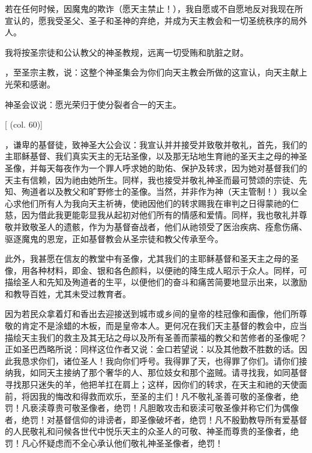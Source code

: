 若在任何时候，因魔鬼的欺诈（愿天主禁止！），我自愿或不自愿地反对我现在所宣认的，愿我受圣父、圣子和圣神的弃绝，并成为天主教会和一切圣统秩序的局外人。\par

我将按圣宗徒和公认教父的神圣教规，远离一切受贿和肮脏之财。\par

，至圣宗主教，说：这整个神圣集会为你们向天主教会所做的这宣认，向天主献上光荣和感谢。\par

神圣会议说：愿光荣归于使分裂者合一的天主。\par

[ (col. 60)]\par

，谦卑的基督徒，致神圣大公会议：我宣认并并接受并致敬并敬礼，首先，我们的主耶稣基督、我们真实天主的无玷圣像，以及那无玷地生育祂的圣天主之母的神圣圣像，并每天每夜作为一个罪人呼求她的助佑、保护及转求，因为她对基督我们的天主有信赖，因为祂由她所生。同样，我也接受并敬礼神圣而最可赞颂的宗徒、先知、殉道者以及教父和旷野修士的圣像。当然，并非作为神（天主管制！）我以全心求他们所有人为我向天主祈祷，使祂因他们的转求赐我在审判之日得蒙祂的仁慈，因为借此我更能彰显我从起初对他们所有的情感和爱情。同样，我也敬礼并尊敬并致敬圣人的遗骸，作为为基督奋战者，他们从祂领受了医治疾病、痊愈伤痛、驱逐魔鬼的恩宠，正如基督教会从圣宗徒和教父传承至今。\par

此外，我甚愿在信友的教堂中有圣像，尤其我们的主耶稣基督和圣天主之母的圣像，用各种材料，即金、银和各色颜料，以便祂的降生成人昭示于众人。同样，可描绘圣人和先知及殉道者的生平，以便他们的奋斗和痛苦简要地显示出来，以激励和教导百姓，尤其未受过教育者。\par

因为若民众拿着灯和香出去迎接送到城市或乡间的皇帝的桂冠像和画像，他们所尊敬的肯定不是涂蜡的木板，而是皇帝本人。更何况在我们天主基督的教会中，应当描绘天主我们的救主及其无玷之母以及所有圣善而蒙福的教父和苦修者的圣像呢？正如圣巴西略所说：同样这位作者又说：金口若望说：以及其他数不胜数的话。因此我恳求你们，诸位圣人！我向你们呼号。我得罪了天，也得罪了你们。请你们接纳我，如同天主接纳了那个奢华的人、那位妓女和那个盗贼。请寻找我，如同基督寻找那只迷失的羊，他把羊扛在肩上；这样，因你们的转求，在天主和祂的天使面前，将因我的悔改和得救而欢乐，至圣的主们！凡不敬礼圣善可敬的圣像者，绝罚！凡亵渎尊贵可敬圣像者，绝罚！凡胆敢攻击和亵渎可敬圣像并称它们为偶像者，绝罚！对基督信仰的诽谤者，即圣像破坏者，绝罚！凡不殷勤教导所有爱基督的人民敬礼和问候各世代中悦乐天主的众圣人的可敬、神圣而尊贵的圣像者，绝罚！凡心怀疑虑而不全心承认他们敬礼神圣圣像者，绝罚！\par

